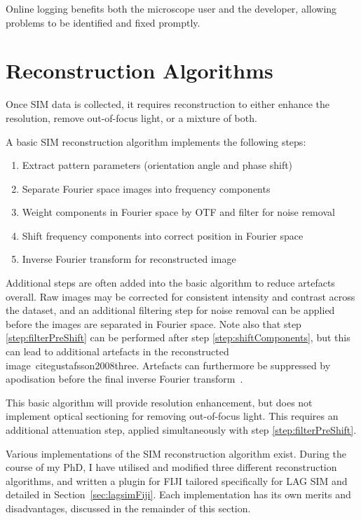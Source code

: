 Online logging benefits both the microscope user and the developer, allowing problems to be identified and fixed promptly. 


\section{Reconstruction Algorithms} \label{sec:recon}
Once SIM data is collected, it requires reconstruction to either enhance the resolution, remove out-of-focus light, or a mixture of both.

A basic SIM reconstruction algorithm implements the following steps:
\begin{enumerate}
	\item Extract pattern parameters (orientation angle and phase shift)
	\item Separate Fourier space images into frequency components
	\item \label{step:filterPreShift}Weight components in Fourier space by OTF and filter for noise removal
	\item \label{step:shiftComponents}Shift frequency components into correct position in Fourier space
	\item Inverse Fourier transform for reconstructed image
\end{enumerate}

Additional steps are often added into the basic algorithm to reduce artefacts overall. 
Raw images may be corrected for consistent intensity and contrast across the dataset, and an additional filtering step for noise removal can be applied before the images are separated in Fourier space. 
Note also that step \ref{step:filterPreShift} can be performed after step \ref{step:shiftComponents}, but this can lead to additional artefacts in the reconstructed image~cite{gustafsson2008three}. 
Artefacts can furthermore be suppressed by apodisation before the final inverse Fourier transform~\cite{gustafsson2008three}. 

This basic algorithm will provide resolution enhancement, but does not implement optical sectioning for removing out-of-focus light.
This requires an additional attenuation step, applied simultaneously with step \ref{step:filterPreShift}. 

Various implementations of the SIM reconstruction algorithm exist.
During the course of my PhD, I have utilised and modified three different reconstruction algorithms, and written a plugin for FIJI tailored specifically for LAG SIM and detailed in Section~\ref{sec:lagsimFiji}.
Each implementation has its own merits and disadvantages, discussed in the remainder of this section.

